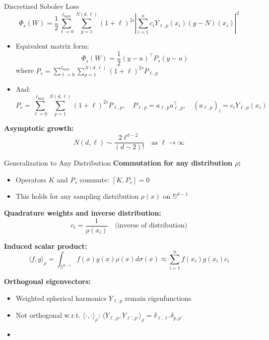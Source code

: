 \documentclass{beamer}
\newcommand{\Sd}{\mathbb{S}^{d-1}}
\begin{document}
\begin{frame}{Discretized Sobolev Loss}
\begin{equation*}
\Phi_s(W) = \frac{1}{2} \sum_{\ell=0}^{\ell_{\max}} \sum_{p=1}^{N(d,\ell)} (1+\ell)^{2s} \left|\sum_{i=1}^n c_i Y_{\ell,p}(x_i)(g-N)(x_i)\right|^2
\end{equation*}
\begin{itemize}
\item Equivalent matrix form:
\[ \Phi_s(W) = \frac{1}{2}(y-u)^\top P_s(y-u) \]
where $P_s = \sum_{\ell=0}^{\ell_{\max}} \sum_{p=1}^{N(d,\ell)} (1+\ell)^{2s}P_{\ell,p}$
\item And:
\[ P_s = \sum_{\ell=0}^{\ell_{\max}} \sum_{p=1}^{N(d,\ell)} (1+\ell)^{2s}P_{\ell,p}, \quad P_{\ell,p} = a_{\ell,p}a_{\ell,p}^\top, \quad (a_{\ell,p})_i = c_iY_{\ell,p}(x_i) \]
\end{itemize}
\textbf{Asymptotic growth:}
\[ N(d,\ell) \sim \frac{2\ell^{d-2}}{(d-2)!} \quad \text{as } \ell \to \infty \]


\end{frame}



\begin{frame}{Generalization to Any Distribution}
\textbf{Commutation for any distribution $\rho$:}
\begin{itemize}
\item Operators $K$ and $P_s$ commute: $[K, P_s] = 0$
\item This holds for any sampling distribution $\rho(x)$ on $\Sd$
\end{itemize}

\textbf{Quadrature weights and inverse distribution:}
\[ c_i = \frac{1}{\rho(x_i)} \quad \text{(inverse of distribution)} \]

\textbf{Induced scalar product:}
\[ \langle f, g \rangle_\rho = \int_{\Sd} f(x) g(x) \rho(x) d\sigma(x) \approx \sum_{i=1}^n f(x_i) g(x_i) c_i \]

\textbf{Orthogonal eigenvectors:}
\begin{itemize}
\item Weighted spherical harmonics $Y_{\ell,p}$ remain eigenfunctions
\item Not orthogonal w.r.t. $\langle \cdot, \cdot \rangle_\rho$: $\langle Y_{\ell,p}, Y_{\ell',p'} \rangle_\rho = \delta_{\ell,\ell'} \delta_{p,p'}$
\item 
\end{itemize}
\end{frame}
\end{document}
